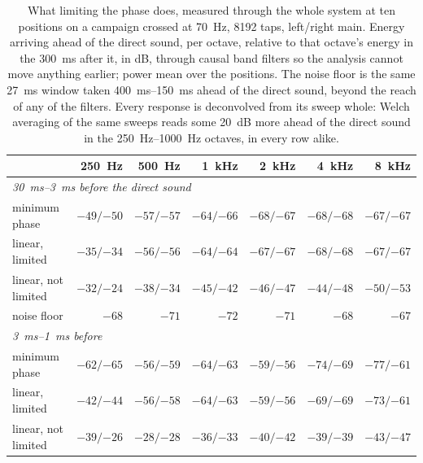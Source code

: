 \begin{table}[ht]
\centering
\small
\setlength{\tabcolsep}{4.5pt}
\renewcommand{\arraystretch}{1.2}
\begin{tabular}{lrrrrrr}
\toprule
 & \SI{250}{\hertz} & \SI{500}{\hertz} & \SI{1}{\kilo\hertz} & \SI{2}{\kilo\hertz} & \SI{4}{\kilo\hertz} & \SI{8}{\kilo\hertz} \\
\midrule
\multicolumn{7}{l}{\textit{\SIrange{30}{3}{\milli\second} before the direct sound}}\\
minimum phase       & $-49/{-50}$ & $-57/{-57}$ & $-64/{-66}$ & $-68/{-67}$ & $-68/{-68}$ & $-67/{-67}$\\
linear, limited     & $-35/{-34}$ & $-56/{-56}$ & $-64/{-64}$ & $-67/{-67}$ & $-68/{-68}$ & $-67/{-67}$\\
linear, not limited & $-32/{-24}$ & $-38/{-34}$ & $-45/{-42}$ & $-46/{-47}$ & $-44/{-48}$ & $-50/{-53}$\\
noise floor         & $-68$ & $-71$ & $-72$ & $-71$ & $-68$ & $-67$\\
\midrule
\multicolumn{7}{l}{\textit{\SIrange{3}{1}{\milli\second} before}}\\
minimum phase       & $-62/{-65}$ & $-56/{-59}$ & $-64/{-63}$ & $-59/{-56}$ & $-74/{-69}$ & $-77/{-61}$\\
linear, limited     & $-42/{-44}$ & $-56/{-58}$ & $-64/{-63}$ & $-59/{-56}$ & $-69/{-69}$ & $-73/{-61}$\\
linear, not limited & $-39/{-26}$ & $-28/{-28}$ & $-36/{-33}$ & $-40/{-42}$ & $-39/{-39}$ & $-43/{-47}$\\
\bottomrule
\end{tabular}
\caption{What limiting the phase does, measured through the whole system at ten
positions on a campaign crossed at \SI{70}{\hertz}, 8192 taps, left/right main.
Energy arriving ahead of the direct sound, per octave, relative to that octave's
energy in the \SI{300}{\milli\second} after it, in dB, through causal band
filters so the analysis cannot move anything earlier; power mean over the
positions. The noise floor is the same \SI{27}{\milli\second} window taken
\SIrange{400}{150}{\milli\second} ahead of the direct sound, beyond the reach of
any of the filters. Every response is deconvolved from its sweep whole: Welch
averaging of the same sweeps reads some \SI{20}{\dB} more ahead of the direct
sound in the \SIrange{250}{1000}{\hertz} octaves, in every row alike.}
\label{tab:phaselimit}
\end{table}


